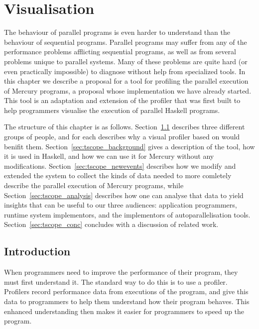 
\chapter{Visualisation}
\label{chap:tscope}

\newcommand{\event}[1]{\code{#1}\xspace}
\newcommand{\metric}[1]{\textsc{#1}\xspace}
\newcommand{\metrictopic}[1]{\textbf{\textsc{#1}}\xspace}


The behaviour of parallel programs is even harder to understand
than the behaviour of sequential programs.
Parallel programs may suffer from
any of the performance problems afflicting sequential programs,
as well as from several problems unique to parallel systems.
Many of these problems are quite hard
(or even practically impossible)
to diagnose without help from specialized tools.
In this chapter we describe a proposal for a tool
for profiling the parallel execution of Mercury programs,
a proposal whose implementation we have already started.
This tool is an adaptation and extension of the \tscope profiler
that was first built to help programmers visualise
the execution of parallel Haskell programs.

The structure of this chapter is as follows.
Section~\ref{sec:tscope_intro} describes three different groups of people,
and for each describes why a visual profiler based on \tscope would benifit
them.
Section~\ref{sec:tscope_background} gives a description of the \tscope tool,
how it is used in Haskell,
and how we can use it for Mercury without any modifications.
Section~\ref{sec:tscope_newevents}
describes how we modify and extended the \tscope system
to collect the kinds of data needed to more comletely describe
the parallel execution of Mercury programs,
while Section~\ref{sec:tscope_analysis} describes how
one can analyse that data to yield insights
that can be useful to our three audiences:
application programmers,
runtime system implementors,
and the implementors of autoparallelisation tools.
Section~\ref{sec:tscope_conc}
concludes with a discussion of related work.

\section{Introduction}
\label{sec:tscope_intro}

When programmers need to improve the performance of their program,
they must first understand it.
The standard way to do this is to use a profiler.
Profilers record performance data from executions of the program,
and give this data to programmers
to help them understand how their program behaves.
This enhanced understanding then makes it easier
for programmers to speed up the program.

